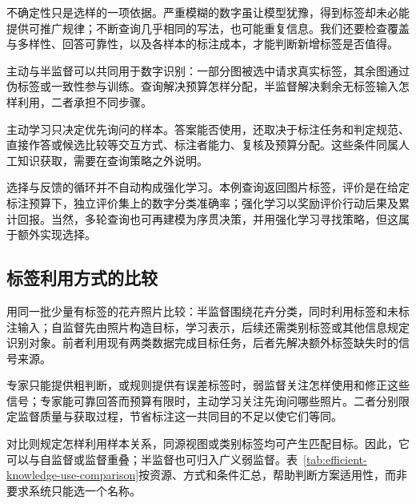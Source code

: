 不确定性只是选样的一项依据。严重模糊的数字虽让模型犹豫，得到标签却未必能提供可推广规律；不断查询几乎相同的写法，也可能重复信息。我们还要检查覆盖与多样性、回答可靠性，以及各样本的标注成本，才能判断新增标签是否值得。

主动与半监督可以共同用于数字识别：一部分图被选中请求真实标签，其余图通过伪标签或一致性参与训练。查询解决预算怎样分配，半监督解决剩余无标签输入怎样利用，二者承担不同步骤。

主动学习只决定优先询问的样本。答案能否使用，还取决于标注任务和判定规范、直接作答或候选比较等交互方式、标注者能力、复核及预算分配。这些条件同属人工知识获取，需要在查询策略之外说明。

选择与反馈的循环并不自动构成强化学习。本例查询返回图片标签，评价是在给定标注预算下，独立评价集上的数字分类准确率；强化学习以奖励评价行动后果及累计回报。当然，多轮查询也可再建模为序贯决策，并用强化学习寻找策略，但这属于额外实现选择。

\subsection{标签利用方式的比较}
\label{sec:efficient-knowledge-use-comparison}

用同一批少量有标签的花卉照片比较：半监督围绕花卉分类，同时利用标签和未标注输入；自监督先由照片构造目标，学习表示，后续还需类别标签或其他信息规定识别对象。前者利用现有两类数据完成目标任务，后者先解决额外标签缺失时的信号来源。

专家只能提供粗判断，或规则提供有误差标签时，弱监督关注怎样使用和修正这些信号；专家能可靠回答而预算有限时，主动学习关注先询问哪些照片。二者分别限定监督质量与获取过程，节省标注这一共同目的不足以使它们等同。

对比则规定怎样利用样本关系，同源视图或类别标签均可产生匹配目标。因此，它可以与自监督或监督重叠；半监督也可归入广义弱监督。表~\ref{tab:efficient-knowledge-use-comparison}按资源、方式和条件汇总，帮助判断方案适用性，而非要求系统只能选一个名称。

